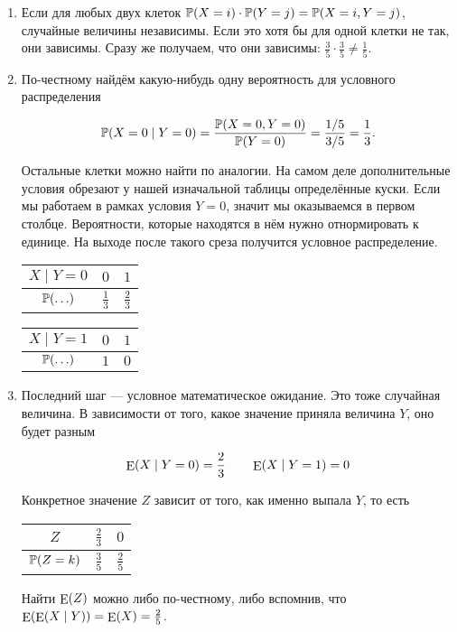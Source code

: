 \begin{problem}
\begin{sol}
\begin{enumerate}
	\item  Если для любых двух клеток $\mathbb{P}(X=i) \cdot \mathbb{P}(Y=j) = \mathbb{P}(X = i, Y=j)$, случайные величины независимы. Если это хотя бы для одной клетки не так, они зависимы. Сразу же получаем, что они зависимы: $\frac{3}{5} \cdot \frac{3}{5}  \ne \frac{1}{5}$.
	
	\item  По-честному найдём какую-нибудь одну вероятность для условного распределения
	
	\[ \mathbb{P}(X = 0 \mid Y = 0) = \frac{\mathbb{P}(X = 0, Y = 0)}{\mathbb{P}(Y = 0)} = \frac{1/5}{3/5} = \frac{1}{3}.\]
	
	Остальные клетки можно найти по аналогии. На самом деле дополнительные условия обрезают у нашей изначальной таблицы определённые куски. Если мы работаем в рамках условия $Y = 0$, значит мы оказываемся в первом столбце. Вероятности, которые находятся в нём нужно отнормировать к единице. На выходе после такого среза получится условное распределение. 
	
		\begin{minipage}[t]{0.45\textwidth}
		\begin{tabular}{c|c|c}
			$X \mid Y =0 $ &   $0 $    &  $1$   \\ \hline
			$\mathbb{P}(\ldots) $   &  $\frac{1}{3}  $     &  $\frac{2}{3} $ 
		\end{tabular}
	\end{minipage}
	\begin{minipage}[t]{0.45\textwidth}
		\begin{tabular}{c|c|c}
		$X \mid Y =1 $&  $0$    &  $1$   \\ \hline
			$\mathbb{P}(\ldots)$   & $ 1$     &  $0$ 
		\end{tabular}
	\end{minipage}	
		
	\item  Последний шаг --- условное математическое ожидание. Это тоже случайная величина. В зависимости от того, какое значение приняла величина $Y$, оно будет разным 
	
	\[ \operatorname{\mathop{E}}(X \mid Y=0) = \frac{2}{3} \qquad \operatorname{\mathop{E}}(X \mid Y = 1) = 0 \]
	
	Конкретное значение $Z$ зависит от того, как именно выпала $Y$, то есть 
	
	\begin{center}
	\begin{tabular}{c|c|c}
		$Z$ &  $ \frac{2}{3}$    &  $ 0 $   \\ \hline
		$\mathbb{P}(Z=k)$   & $ \frac{3}{5} $     &  $\frac{2}{5}$ 
	\end{tabular}
	\end{center}

Найти $\operatorname{\mathop{E}}(Z)$ можно либо по-честному, либо вспомнив, что $\operatorname{\mathop{E}}(\operatorname{\mathop{E}}(X \mid Y)) = \operatorname{\mathop{E}}(X) = \frac{2}{5}$.
\end{enumerate}
\end{sol} 
\end{problem}


